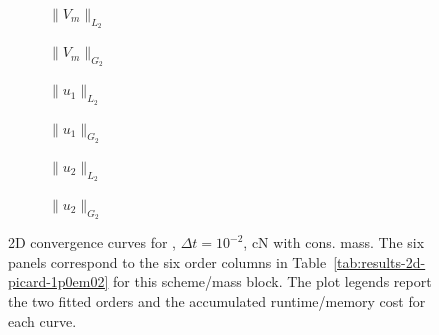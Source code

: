 \begin{figure}[p]
\centering
\begin{subfigure}{0.485\linewidth}
\centering
{}
\caption{$\|V_m\|_{L_2}$}
\label{fig:results-2d-picard-1p0em02-cranknicolson-consistent-a}
\end{subfigure}
\hfill
\begin{subfigure}{0.485\linewidth}
\centering
{}
\caption{$\|V_m\|_{G_2}$}
\label{fig:results-2d-picard-1p0em02-cranknicolson-consistent-b}
\end{subfigure}
\par\vspace{0.8em}
\begin{subfigure}{0.485\linewidth}
\centering
{}
\caption{$\|u_1\|_{L_2}$}
\label{fig:results-2d-picard-1p0em02-cranknicolson-consistent-c}
\end{subfigure}
\hfill
\begin{subfigure}{0.485\linewidth}
\centering
{}
\caption{$\|u_1\|_{G_2}$}
\label{fig:results-2d-picard-1p0em02-cranknicolson-consistent-d}
\end{subfigure}
\par\vspace{0.8em}
\begin{subfigure}{0.485\linewidth}
\centering
{}
\caption{$\|u_2\|_{L_2}$}
\label{fig:results-2d-picard-1p0em02-cranknicolson-consistent-e}
\end{subfigure}
\hfill
\begin{subfigure}{0.485\linewidth}
\centering
{}
\caption{$\|u_2\|_{G_2}$}
\label{fig:results-2d-picard-1p0em02-cranknicolson-consistent-f}
\end{subfigure}
\caption{2D convergence curves for , $\Delta t=10^{-2}$, cN with cons. mass. The six panels correspond to the six order columns in Table~\ref{tab:results-2d-picard-1p0em02} for this scheme/mass block. The plot legends report the two fitted orders and the accumulated runtime/memory cost for each curve.}
\label{fig:results-2d-picard-1p0em02-cranknicolson-consistent}
\end{figure}
\FloatBarrier

